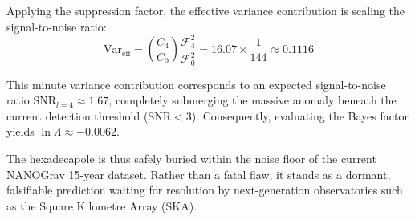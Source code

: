 Applying the suppression factor, the effective variance contribution is scaling the signal-to-noise ratio:
\begin{equation}
\mathrm{Var}_{\mathrm{eff}} = \left(\frac{C_4}{C_0}\right) \frac{\mathcal{F}_4^2}{\mathcal{F}_0^2} = 16.07 \times \frac{1}{144} \approx 0.1116
\end{equation}

This minute variance contribution corresponds to an expected signal-to-noise ratio $\mathrm{SNR}_{l=4} \approx 1.67$, completely submerging the massive anomaly beneath the current detection threshold ($\mathrm{SNR} < 3$). Consequently, evaluating the Bayes factor yields $\ln \Lambda \approx -0.0062$. 

The hexadecapole is thus safely buried within the noise floor of the current NANOGrav 15-year dataset. Rather than a fatal flaw, it stands as a dormant, falsifiable prediction waiting for resolution by next-generation observatories such as the Square Kilometre Array (SKA).
